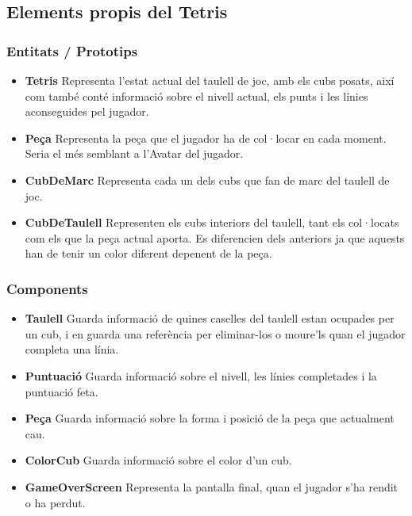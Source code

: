   \subsection{Elements propis del Tetris}

    \subsubsection{Entitats / Prototips}

      \begin{itemize}
        \item {\bf Tetris}
          Representa l'estat actual del taulell de joc, amb els cubs posats, així com també conté informació sobre el nivell actual, els punts i les línies aconseguides pel jugador.
          
        \item {\bf Peça}
          Representa la peça que el jugador ha de col·locar en cada moment. Seria el més semblant a l'Avatar del jugador.
          
        \item {\bf CubDeMarc}
          Representa cada un dels cubs que fan de marc del taulell de joc.
          
        \item {\bf CubDeTaulell}
          Representen els cubs interiors del taulell, tant els col·locats com els que la peça actual aporta. Es diferencien dels anteriors ja que aquests han de tenir un color diferent depenent de la peça.
          
      \end{itemize}

    \subsubsection{Components}

      \begin{itemize}
        \item {\bf Taulell}
          Guarda informació de quines caselles del taulell estan ocupades per un cub, i en guarda una referència per eliminar-los o moure'ls quan el jugador completa una línia.
          
        \item {\bf Puntuació}
          Guarda informació sobre el nivell, les línies completades i la puntuació feta.
          
        \item {\bf Peça}
          Guarda informació sobre la forma i posició de la peça que actualment cau.
          
        \item {\bf ColorCub}
          Guarda informació sobre el color d'un cub.
          
        \item {\bf GameOverScreen}
          Representa la pantalla final, quan el jugador s'ha rendit o ha perdut.
          
      \end{itemize}

